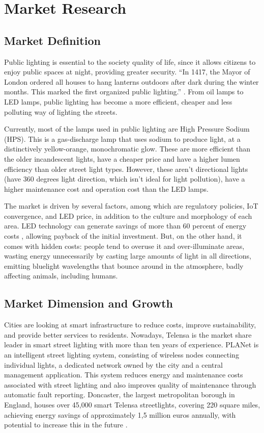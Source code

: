 \section{Market Research}
\subsection{Market Definition}
Public lighting is essential to the society quality of life, since it allows citizens to enjoy public spaces at night, providing greater security. “In 1417, the Mayor of London ordered all houses to hang lanterns outdoors after dark during the winter months. This marked the first organized public lighting.” \cite{street_lighting_history}. From oil lamps to LED lamps, public lighting has become a more efficient, cheaper and less polluting way of lighting the streets. 

Currently, most of the lamps used in public lighting are High Pressure Sodium (HPS). This is a gas-discharge lamp that uses sodium to produce light, at a distinctively yellow-orange, monochromatic glow. These are more efficient than the older incandescent lights, have a cheaper price and have a higher lumen efficiency than older street light types. However, these aren’t directional lights (have 360 degrees light direction, which isn't ideal for light pollution), have a higher maintenance cost and operation cost than the LED lamps. 

The market is driven by several factors, among which are regulatory policies, IoT convergence, and LED price, in addition to the culture and morphology of each area. LED technology can generate savings of more than 60 percent of energy costs \cite{light_pollution}, allowing payback of the initial investment. But, on the other hand, it comes with hidden costs: people tend to overuse it and over-illuminate areas, wasting energy unnecessarily by casting large amounts of light in all directions, emitting bluelight wavelengths that bounce around in the atmosphere, badly affecting animals, including humans.

\subsection{Market Dimension and Growth}

Cities are looking at smart infrastructure to reduce costs, improve sustainability, and provide better services to residents. Nowadays, Telensa is the market share leader in smart street lighting with more than ten years of experience. PLANet is an  intelligent street lighting system, consisting of wireless nodes connecting individual lights, a dedicated network owned by the city and a central management application. This system reduces energy and maintenance costs associated with street lighting and also improves quality of maintenance through automatic fault reporting. Doncaster, the largest metropolitan borough in England, houses over 45,000 smart Telensa streetlights, covering 220 square miles, achieving energy savings of approximately 1,5 million euros annually, with potential to increase this in the future \cite{telensa}.

